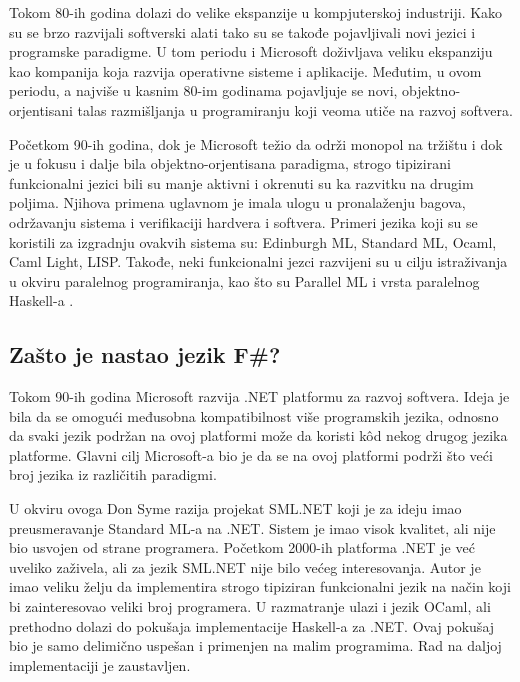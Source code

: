 \documentclass[a4paper]{article}
\begin{document}
Tokom 80-ih godina dolazi do velike ekspanzije u kompjuterskoj industriji. Kako su se brzo razvijali softverski alati tako su se takođe pojavljivali novi jezici i programske paradigme. U tom periodu i Microsoft doživljava veliku ekspanziju kao kompanija koja razvija operativne sisteme i aplikacije. Međutim, u ovom periodu, a najviše u kasnim 80-im godinama pojavljuje se novi, objektno-orjentisani talas razmišljanja u programiranju koji veoma utiče na razvoj softvera.

Početkom 90-ih godina, dok je Microsoft težio da održi monopol na tržištu i dok je u fokusu i dalje bila objektno-orjentisana paradigma, strogo tipizirani funkcionalni jezici bili su manje aktivni i okrenuti su ka razvitku na drugim poljima. Njihova primena uglavnom je imala ulogu u pronalaženju bagova, održavanju sistema i verifikaciji hardvera i softvera. Primeri jezika koji su se koristili za izgradnju ovakvih sistema su: Edinburgh ML, Standard ML, Ocaml, Caml Light, LISP. Takođe, neki funkcionalni jezci razvijeni su u cilju istraživanja u okviru paralelnog programiranja, kao što su Parallel ML i vrsta paralelnog Haskell-a \cite{early_history}. 

\subsection{Zašto je nastao jezik F\#?}
\label{subsec:nastanak}

Tokom 90-ih godina Microsoft razvija .NET \cite{microsoft_.net,early_history} platformu za razvoj softvera. Ideja je bila da se omogući međusobna kompatibilnost više programskih jezika, odnosno da svaki jezik podržan na ovoj platformi može da koristi kôd nekog drugog jezika platforme. Glavni cilj Microsoft-a bio je da se na ovoj platformi podrži što veći broj jezika iz različitih paradigmi. 

U okviru ovoga Don Syme razija projekat SML.NET koji je za ideju imao preusmeravanje Standard ML-a na .NET. Sistem je imao visok kvalitet, ali nije bio usvojen od strane programera. Početkom 2000-ih platforma .NET je već uveliko zaživela, ali za jezik SML.NET nije bilo većeg interesovanja. Autor je imao veliku želju da implementira strogo tipiziran funkcionalni jezik na način koji bi zainteresovao veliki broj programera. U razmatranje ulazi i jezik OCaml, ali prethodno dolazi do pokušaja implementacije Haskell-a za .NET. Ovaj pokušaj bio je samo delimično uspešan i primenjen na malim programima. Rad na daljoj implementaciji je zaustavljen.
\end{document}
